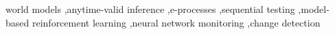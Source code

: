 \documentclass[preprint,12pt,authoryear]{elsarticle}
\theoremstyle{plain}
\theoremstyle{definition}
\begin{document}
\begin{frontmatter}
\begin{keyword}
world models \sep anytime-valid inference \sep e-processes \sep sequential testing \sep model-based reinforcement learning \sep neural network monitoring \sep change detection
\end{keyword}

\end{frontmatter}








\appendix






\end{document}
